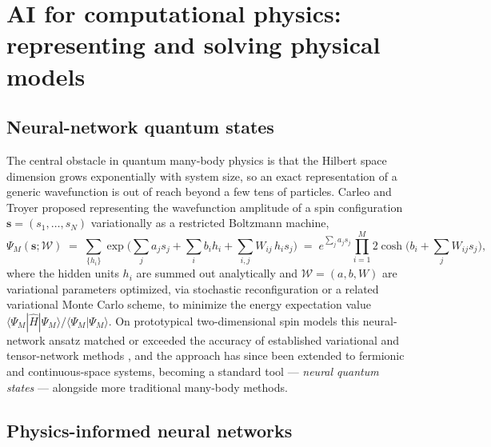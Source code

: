 \documentclass[11pt]{article}
\begin{document}
\section{AI for computational physics: representing and solving physical models}
\label{sec:models}

\subsection{Neural-network quantum states}

The central obstacle in quantum many-body physics is that the Hilbert space dimension grows exponentially with system size, so an exact representation of a generic wavefunction is out of reach beyond a few tens of particles. Carleo and Troyer proposed representing the wavefunction amplitude of a spin configuration $\mathbf{s} = (s_1,\dots,s_N)$ variationally as a restricted Boltzmann machine,
\begin{equation}
\Psi_M(\mathbf{s}; \mathcal{W}) \;=\; \sum_{\{h_i\}} \exp\!\Big(\sum_j a_j s_j + \sum_i b_i h_i + \sum_{i,j} W_{ij}\, h_i s_j\Big)
\;=\; e^{\sum_j a_j s_j}\prod_{i=1}^{M} 2\cosh\!\Big(b_i + \sum_j W_{ij}s_j\Big),
\end{equation}
where the hidden units $h_i$ are summed out analytically and $\mathcal{W} = (a,b,W)$ are variational parameters optimized, via stochastic reconfiguration or a related variational Monte Carlo scheme, to minimize the energy expectation value $\langle \Psi_M | \hat H | \Psi_M\rangle / \langle \Psi_M|\Psi_M\rangle$. On prototypical two-dimensional spin models this neural-network ansatz matched or exceeded the accuracy of established variational and tensor-network methods \cite{carleo2017}, and the approach has since been extended to fermionic and continuous-space systems, becoming a standard tool --- \emph{neural quantum states} --- alongside more traditional many-body methods.

\subsection{Physics-informed neural networks}
\end{document}
